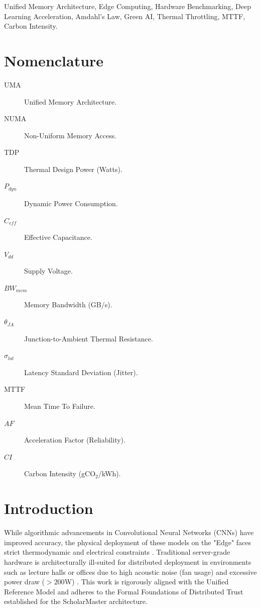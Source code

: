 \documentclass[conference]{IEEEtran}
\begin{document}
\begin{IEEEkeywords}
Unified Memory Architecture, Edge Computing, Hardware Benchmarking, Deep Learning Acceleration, Amdahl's Law, Green AI, Thermal Throttling, MTTF, Carbon Intensity.
\end{IEEEkeywords}

\section*{Nomenclature}
\begin{description}
    \item[UMA] Unified Memory Architecture.
    \item[NUMA] Non-Uniform Memory Access.
    \item[TDP] Thermal Design Power (Watts).
    \item[$P_{dyn}$] Dynamic Power Consumption.
    \item[$C_{eff}$] Effective Capacitance.
    \item[$V_{dd}$] Supply Voltage.
    \item[$BW_{mem}$] Memory Bandwidth (GB/s).
    \item[$\theta_{JA}$] Junction-to-Ambient Thermal Resistance.
    \item[$\sigma_{lat}$] Latency Standard Deviation (Jitter).
    \item[MTTF] Mean Time To Failure.
    \item[$AF$] Acceleration Factor (Reliability).
    \item[$CI$] Carbon Intensity (gCO$_2$/kWh).
\end{description}

\section{Introduction}
While algorithmic advancements in Convolutional Neural Networks (CNNs) have improved accuracy, the physical deployment of these models on the "Edge" faces strict thermodynamic and electrical constraints \cite{b15}. Traditional server-grade hardware is architecturally ill-suited for distributed deployment in environments such as lecture halls or offices due to high acoustic noise (fan usage) and excessive power draw ($>200$W) \cite{b5}. This work is rigorously aligned with the Unified Reference Model \cite{P20} and adheres to the Formal Foundations of Distributed Trust \cite{P21} established for the ScholarMaster architecture.
\end{document}
